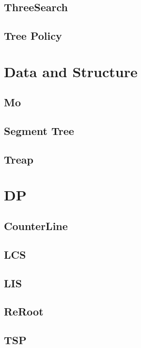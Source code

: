 \subsection{ThreeSearch}

\subsection{Tree Policy}



\section{Data and Structure}

\subsection{Mo}

\subsection{Segment Tree}

\subsection{Treap}


\section{DP}

\subsection{CounterLine}

\subsection{LCS}

\subsection{LIS}

\subsection{ReRoot}

\subsection{TSP}


